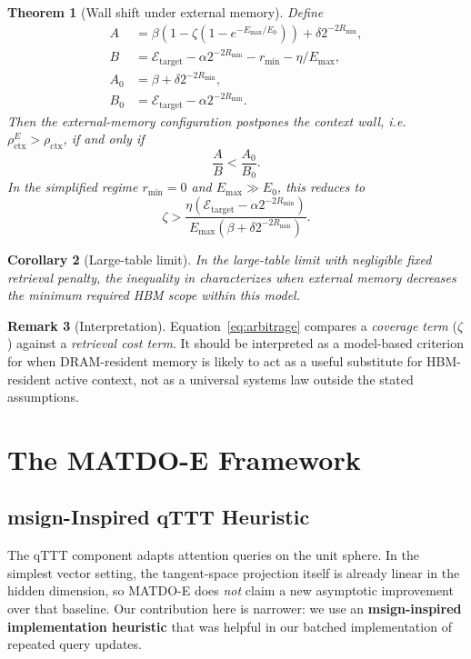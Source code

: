 \documentclass[11pt,a4paper]{article}
\theoremstyle{plain}
\newtheorem{theorem}{Theorem}[section]
\newtheorem{corollary}[theorem]{Corollary}
\theoremstyle{definition}
\newtheorem{remark}[theorem]{Remark}
\begin{document}
\begin{theorem}[Wall shift under external memory]\label{thm:arbitrage}
Define
\begin{align*}
A &= \beta(1-\zeta(1-e^{-E_{\max}/E_0})) + \delta 2^{-2R_{\min}}, \\
B &= \mathcal{E}_{\text{target}} - \alpha 2^{-2R_{\min}} - r_{\min} - \eta/E_{\max}, \\
A_0 &= \beta + \delta 2^{-2R_{\min}}, \\
B_0 &= \mathcal{E}_{\text{target}} - \alpha 2^{-2R_{\min}}.
\end{align*}
Then the external-memory configuration postpones the context wall, i.e.\ $\rho_{\text{ctx}}^E > \rho_{\text{ctx}}$, if and only if
\[
\frac{A}{B} < \frac{A_0}{B_0}.
\]
In the simplified regime $r_{\min}=0$ and $E_{\max}\gg E_0$, this reduces to
\begin{equation}
\zeta > \frac{\eta(\mathcal{E}_{\text{target}} - \alpha 2^{-2R_{\min}})}{E_{\max}(\beta + \delta 2^{-2R_{\min}})}.
\label{eq:arbitrage}
\end{equation}
\end{theorem}

\begin{corollary}[Large-table limit]
In the large-table limit with negligible fixed retrieval penalty, the inequality in  characterizes when external memory decreases the minimum required HBM scope within this model.
\end{corollary}

\begin{remark}[Interpretation]
Equation~\eqref{eq:arbitrage} compares a \emph{coverage term} ($\zeta$) against a \emph{retrieval cost term}. It should be interpreted as a model-based criterion for when DRAM-resident memory is likely to act as a useful substitute for HBM-resident active context, not as a universal systems law outside the stated assumptions.
\end{remark}

\section{The MATDO-E Framework}
\label{sec:method}

\subsection{msign-Inspired qTTT Heuristic}
\label{sec:msign}
The qTTT component adapts attention queries on the unit sphere. In the simplest vector setting, the tangent-space projection itself is already linear in the hidden dimension, so MATDO-E does \emph{not} claim a new asymptotic improvement over that baseline. Our contribution here is narrower: we use an \textbf{msign-inspired implementation heuristic} that was helpful in our batched implementation of repeated query updates.
\end{document}

